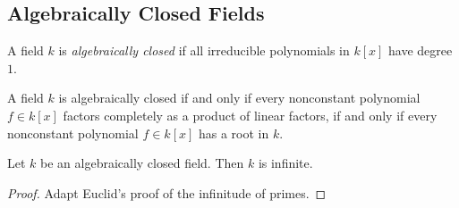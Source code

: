 \subsection{Algebraically Closed Fields}\label{algebraicallyclosedfields}
A field $k$ is \emph{algebraically closed} if all irreducible polynomials in $k[x]$ have degree $1$.

\begin{lemma}
A field $k$ is algebraically closed if and only if every nonconstant polynomial $f \in k[x]$ factors completely as a product of linear factors, if and only if
every nonconstant polynomial $f \in k[x]$ has a root in $k$.
\end{lemma}

\begin{proposition}
Let $k$ be an algebraically closed field. Then $k$ is infinite.
\end{proposition}

\begin{proof}
Adapt Euclid's proof of the infinitude of primes.
\end{proof}